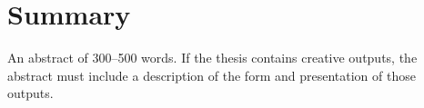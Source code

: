 \chapter*{Summary}

An abstract of 300–500 words. If the thesis contains creative outputs, the abstract must include a description of the form and presentation of those outputs.
